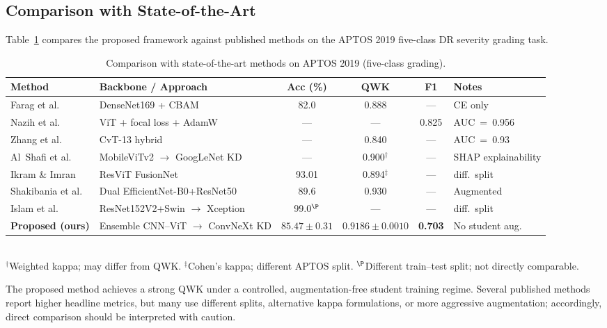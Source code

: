 \documentclass[a4paper,fleqn]{cas-dc}
\begin{document}
\subsection{Comparison with State-of-the-Art}

Table~\ref{tab:sota} compares the proposed framework against published methods on the APTOS 2019 five-class DR severity grading task.

\begin{table}[t]
\centering
\caption{Comparison with state-of-the-art methods on APTOS 2019 (five-class grading).}
\label{tab:sota}
\begin{tabular}{p{3.0cm}p{4.0cm}ccc p{3.2cm}}
\toprule
Method & Backbone / Approach & Acc (\%) & QWK & F1 & Notes \\
\midrule
Farag et al.\ \cite{farag2022} & DenseNet169 + CBAM & 82.0 & 0.888 & --- & CE only \\
Nazih et al.\ \cite{nazih2023} & ViT + focal loss + AdamW & --- & --- & 0.825 & AUC~=~0.956 \\
Zhang et al.\ \cite{zhang2025} & CvT-13 hybrid & --- & 0.840 & --- & AUC~=~0.93 \\
Al~Shafi et al.\ \cite{alshafi2024} & MobileViTv2 $\to$ GoogLeNet KD & --- & 0.900$^{\dag}$ & --- & SHAP explainability \\
Ikram \& Imran \cite{ikram2025} & ResViT FusionNet & 93.01 & 0.894$^{\ddag}$ & --- & diff.\ split \\
Shakibania et al.\ \cite{shakibania2024} & Dual EfficientNet-B0+ResNet50 & 89.6 & 0.930 & --- & Augmented \\
Islam et al.\ \cite{islam2023} & ResNet152V2+Swin $\to$ Xception & 99.0$^{\P}$ & --- & --- & diff.\ split \\
\midrule
\textbf{Proposed (ours)} & Ensemble CNN--ViT $\to$ ConvNeXt KD & $\mathbf{85.47 \pm 0.31}$ & $\mathbf{0.9186 \pm 0.0010}$ & \textbf{0.703} & No student aug. \\
\bottomrule
\end{tabular}
\medskip\\
{\footnotesize $^{\dag}$Weighted kappa; may differ from QWK. $^{\ddag}$Cohen's kappa; different APTOS split. $^{\P}$Different train--test split; not directly comparable.}
\end{table}

The proposed method achieves a strong QWK under a controlled, augmentation-free student training regime. Several published methods report higher headline metrics, but many use different splits, alternative kappa formulations, or more aggressive augmentation; accordingly, direct comparison should be interpreted with caution.
\end{document}
